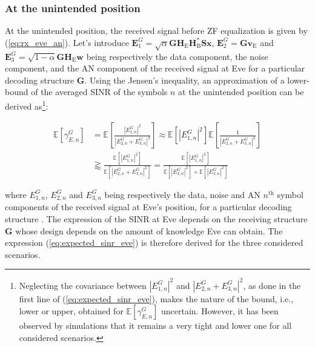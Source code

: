 \documentclass[journal,comsoc]{IEEEtran}
\newcommand{\EX}[1]{\mathbb{E} \left[#1\right]}%
\newcommand{\HE}{\textbf{H}_{\text{E}}}
\newcommand{\HB}{\textbf{H}_{\text{B}}}
\newcommand{\spread}{\textbf{S}}
\newcommand{\w}{\textbf{w}}
\newcommand{\mat}[1]{\boldsymbol{\mathrm{#1}}}
\begin{document}
\subsubsection{At the unintended position}
At the unintended position, the received signal before ZF equalization is given by (\ref{eq:rx_eve_an}). Let's introduce $\textbf{E}_1^G = \sqrt{\alpha}  \textbf{G} \HE \HB^* \spread\textbf{x} $, $\textbf{E}_2^G = \textbf{G}  \textbf{v}_\text{E}$ and $\textbf{E}_3^G = \sqrt{1-\alpha} \textbf{G} \HE \w$ being respectively the data component, the noise component, and the AN component of the received signal at Eve  for a particular decoding structure $\textbf{G}$. Using the Jensen's inequality, an approximation of a lower-bound of the averaged SINR of the symbols $n$ at the unintended position can be derived as\footnote{Neglecting the covariance between $\left|E_{1,n}^G\right|^2$ and $\left| E_{2,n}^G + E_{3,n}^G \right|^2$, as  done in the first line of (\ref{eq:expected_sinr_eve}), makes the nature of the bound, i.e., lower or upper, obtained for $\EX{\gamma_{E,n}^G}$ uncertain. However, it has been observed by simulations that it remains a very tight and lower one for all considered scenarios.}:

\begin{equation}
\begin{split}
\EX{\gamma_{E,n}^G} &= \EX{  \frac{ \left| E_{1,n}^G \right|^2  }{ \left| E_{2,n}^G + E_{3,n}^G \right|^2 } }  \approx  \EX{ \left| E_{1,n}^G \right|^2 }  \EX{ \frac{1}{ \left| E_{2,n}^G + E_{3,n}^G \right|^2} }  \\
& \gtrapprox \frac{\EX{   \left| E_{1,n}^G \right|^2  } }{\EX{ \left| E_{2,n}^G + E_{3,n}^G \right|^2  }} =  \frac{\EX{  \left| E_{1,n}^G \right|^2  } }{\EX{  \left| E_{2,n}^G \right|^2  } +  \EX{  \left|E_{3,n}^G \right|^2  }}
\label{eq:expected_sinr_eve}
\end{split}
\end{equation}

where $E_{1,n}^G$, $E_{2,n}^G$ and $E_{3,n}^G$ being respectively the data, noise and AN $n^{\text{th}}$ symbol components of the received signal at Eve's position, for a particular decoding structure \mat{G}. The expression of the SINR at Eve depends on the receiving structure $\textbf{G}$ whose design depends on the amount of knowledge Eve can obtain. The expression (\ref{eq:expected_sinr_eve}) is therefore derived for  the three considered scenarios.
\end{document}

